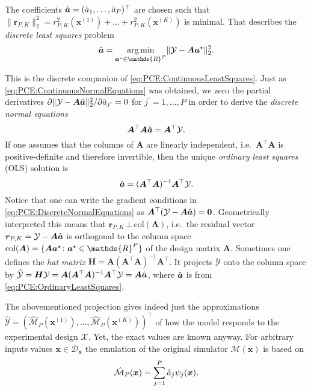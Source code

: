 The coefficients \(\hat{\bm{a}} = (\hat{a}_1,\ldots,\hat{a}_P)^\top\) are chosen such that
\(\lVert \bm{r}_{P,K} \rVert_2^2 = r_{P,K}^2(\bm{x}^{(1)}) + \ldots + r_{P,K}^2(\bm{x}^{(K)})\) is minimal.
That describes the \emph{discrete least squares} problem
\begin{equation} \label{eq:PCE:DiscreteLeastSquares}
  \hat{\bm{\coeffM}} = \operatorname*{arg\,min}_{\bm{\coeffM}^\star \in \mathds{R}^P} \lVert \mathcal{Y} - \bm{A} \bm{\coeffM}^{\star} \rVert_2^2.
\end{equation}
\par %
This is the discrete companion of \cref{eq:PCE:ContinuousLeastSquares}.
Just as \cref{eq:PCE:ContinuousNormalEquations} was obtained, we zero the partial derivatives
\(\partial \lVert \mathcal{Y} - \bm{A} \hat{\bm{a}} \rVert_2^2 / \partial \hat{a}_{j^\prime} = 0\) for \(j^\prime = 1,\ldots,P\)
in order to derive the \emph{discrete normal equations}
\begin{equation} \label{eq:PCE:DiscreteNormalEquations}
  \bm{A}^\top \bm{A} \hat{\bm{a}} = \bm{A}^\top \mathcal{Y}.
\end{equation}
If one assumes that the columns of \(\bm{A}\) are linearly independent, i.e.\ \(\bm{A}^\top \bm{A}\) is positive-definite and therefore invertible,
then the unique \emph{ordinary least squares} (OLS) solution is
\begin{equation} \label{eq:PCE:OrdinaryLeastSquares}
  \hat{\bm{a}} = (\bm{A}^\top \bm{A})^{-1} \bm{A}^\top \mathcal{Y}.
\end{equation}
Notice that one can write the gradient conditions in \cref{eq:PCE:DiscreteNormalEquations} as \(\bm{A}^\top (\mathcal{Y} - \bm{A} \hat{\bm{a}}) = \bm{0}\).
Geometrically interpreted this means that \(\bm{r}_{P,K} \, \bot \, \mathrm{col}(\bm{A})\),
i.e.\ the residual vector \(\bm{r}_{P,K} = \mathcal{Y} - \bm{A} \hat{\bm{a}}\) is orthogonal to the column space
\(\mathrm{col}(\bm{A}) = \{\bm{A} \bm{\coeffM}^\star \colon \bm{\coeffM}^\star \in \mathds{R}^P\}\) of the design matrix \(\bm{A}\).
Sometimes one defines the \emph{hat matrix} \(\bm{H} = \bm{A} (\bm{A}^\top \bm{A})^{-1} \bm{A}^\top\).
It projects \(\mathcal{Y}\) onto the column space by \(\hat{\mathcal{Y}} = \bm{H} \mathcal{Y} = \bm{A} (\bm{A}^\top \bm{A})^{-1} \bm{A}^\top \mathcal{Y} = \bm{A} \hat{\bm{a}}\),
where \(\hat{\bm{a}}\) is from \cref{eq:PCE:OrdinaryLeastSquares}.
\par %
The abovementioned projection gives indeed just the approximations \(\hat{\mathcal{Y}} = (\hat{\mathcal{M}}_P(\bm{x}^{(1)}),\ldots,\hat{\mathcal{M}}_P(\bm{x}^{(K)}))^\top\)
of how the model responds to the experimental design \(\mathcal{X}\).
Yet, the exact values are known anyway.
For arbitrary inputs values \(\bm{x} \in \mathcal{D}_{\bm{x}}\) the emulation of the original simulator \(\mathcal{M}(\bm{x})\) is based on
\begin{equation} \label{eq:PCE:Metamodel}
  \hat{\mathcal{M}}_P(\bm{x}) = \sum_{j=1}^P \hat{a}_{j} \psi_{j}(\bm{x}).
\end{equation}

